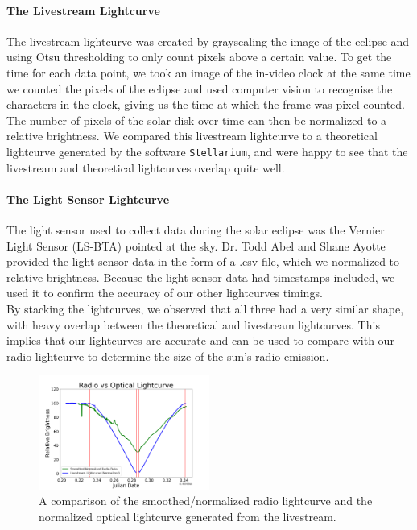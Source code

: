 \paragraph{The Livestream Lightcurve}
The livestream lightcurve was created by grayscaling the image of the eclipse and using Otsu thresholding to only count pixels above a certain value.
To get the time for each data point, we took an image of the in-video clock at the same time we counted the pixels of the eclipse and used computer vision to recognise the characters in the clock, giving us the time at which the frame was pixel-counted.
The number of pixels of the solar disk over time can then be normalized to a relative brightness.
We compared this livestream lightcurve to a theoretical lightcurve generated by the software \texttt{Stellarium}\cite{zotti_simulated_2020}, and were happy to see that the livestream and theoretical lightcurves overlap quite well.
\paragraph{The Light Sensor Lightcurve}
The light sensor used to collect data during the solar eclipse was the Vernier Light Sensor (LS-BTA) pointed at the sky.
Dr. Todd Abel and Shane Ayotte provided the light sensor data in the form of a .csv file, which we normalized to relative brightness.
Because the light sensor data had timestamps included, we used it to confirm the accuracy of our other lightcurves timings.
\\
By stacking the lightcurves, we observed that all three had a very similar shape, with heavy overlap between the theoretical and livestream lightcurves.
This implies that our lightcurves are accurate and can be used to compare with our radio lightcurve to determine the size of the sun’s radio emission.
\\
\begin{figure}
    \includegraphics[width=0.5\textwidth]{figures/radioOpticalComparison}
    \caption{\label{fig:radioOpticalComparison} A comparison of the smoothed/normalized radio lightcurve and the normalized optical lightcurve generated from the livestream.}
\end{figure}